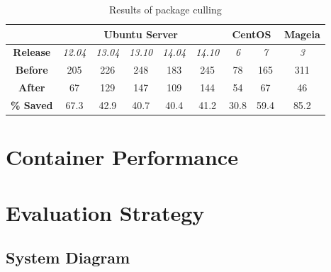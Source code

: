 \begin{table}[h]
\centering
\label{table:culling}
    \begin{tabular}{| c | c | c | c | c | c | c | c | c |}
    \hline
& \multicolumn{5}{|c|}{\bfseries Ubuntu Server} & \multicolumn{2}{|c|}{\bfseries CentOS} & \multicolumn{1}{|c|}{\bfseries Mageia} \\ \hline
    \bfseries Release & \itshape 12.04 & \itshape 13.04 & \itshape 13.10 & \itshape 14.04 & \itshape 14.10  & \itshape 6 & \itshape 7 & \itshape 3 \\ \hline
    \bfseries Before & 205 & 226 & 248 & 183 & 245 & 78 & 165 & 311\\ \hline
    \bfseries After & 67 & 129 & 147 & 109 & 144 & 54 & 67 & 46   \\ \hline \hline
    \bfseries \% Saved & 67.3 & 42.9 & 40.7 & 40.4 & 41.2 & 30.8 & 59.4 & 85.2\\
    \hline
    \end{tabular}
\caption{Results of package culling}
\label{table:diff}
\end{table}
\section{Container Performance}
\newpage
\clearpage
\newpage
\section{Evaluation Strategy}
\subsection{System Diagram}

